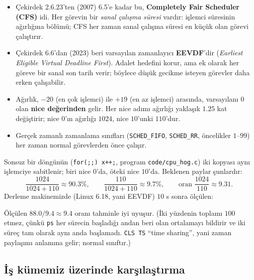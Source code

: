 \documentclass[11pt,a4paper]{article}
\newcommand{\term}[1]{\textbf{\color{mintdeep}#1}}
\newcommand{\cmd}[1]{\texttt{#1}}
\begin{document}
\begin{itemize}
  \item Çekirdek 2.6.23'ten (2007) 6.5'e kadar bu, \textbf{Completely Fair Scheduler (CFS)} idi. Her görevin bir \emph{sanal çalışma süresi} vardır: işlemci süresinin ağırlığına bölümü; CFS her zaman sanal çalışma süresi en küçük olan görevi çalıştırır.
  \item Çekirdek 6.6'dan (2023) beri varsayılan zamanlayıcı \textbf{EEVDF}'dir (\emph{Earliest Eligible Virtual Deadline First}). Adalet hedefini korur, ama ek olarak her göreve bir sanal son tarih verir; böylece düşük gecikme isteyen görevler daha erken çalışabilir.
  \item Ağırlık, $-20$ (en çok işlemci) ile $+19$ (en az işlemci) arasında, varsayılanı $0$ olan \term{nice değerinden} gelir. Her nice adımı ağırlığı yaklaşık $1.25$ kat değiştirir; nice $0$'ın ağırlığı $1024$, nice $10$'unki $110$'dur.
  \item Gerçek zamanlı zamanlama sınıfları (\texttt{SCHED\_FIFO}, \texttt{SCHED\_RR}, öncelikler $1$--$99$) her zaman normal görevlerden önce çalışır.
\end{itemize}

\begin{example}
Sonsuz bir döngünün (\texttt{for(;;) x++;}, program \texttt{code/cpu\_hog.c}) iki kopyası aynı işlemciye sabitlenir; biri nice $0$'da, öteki nice $10$'da. Beklenen paylar şunlardır:
\[
\frac{1024}{1024+110} \approx 90.3\%, \qquad \frac{110}{1024+110} \approx 9.7\%, \qquad \text{oran } \frac{1024}{110} \approx 9.31 .
\]
Derleme makinemizde (Linux 6.18, yani EEVDF) $10$ s sonra ölçülen:

Ölçülen $88.0/9.4 \approx 9.4$ oranı tahminle iyi uyuşur. (İki yüzdenin toplamı $100$ etmez, çünkü \cmd{ps} her sürecin başladığı andan beri olan ortalamayı bildirir ve iki süreç tam olarak aynı anda başlamadı. \texttt{CLS TS} ``time sharing'', yani zaman paylaşımı anlamına gelir; normal sınıftır.)
\end{example}

\subsection{İş kümemiz üzerinde karşılaştırma}
\end{document}
